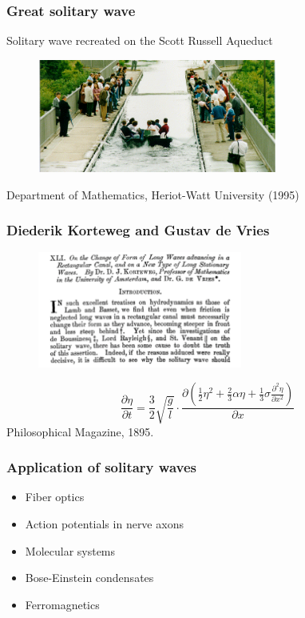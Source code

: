 \documentclass[16pt]{beamer}
\begin{document}
\begin{frame}
	\frametitle{ Great solitary wave }   
	\fontsize{16}{7.2}\selectfont
Solitary wave recreated on the Scott Russell Aqueduct
\begin{figure}[H]
\centering
\includegraphics[width=0.7\textwidth]{images/watersoliton.png}
\end{figure}
Department of Mathematics, Heriot-Watt University (1995)
\end{frame}

\begin{frame}
\frametitle{Diederik Korteweg and Gustav de Vries}
\fontsize{16}{7.2}\selectfont
\begin{figure}[H]
\centering
\includegraphics[width=0.6\textwidth]{images/KdVtitle2.png}
\end{figure}
\[
\frac{\partial \eta}{\partial t} = \frac{3}{2} \sqrt{\frac{g}{l}}\cdot
\frac{\partial
\left( \frac{1}{2} \eta^2 + \frac{2}{3} \alpha \eta + \frac{1}{3} \sigma \frac{\partial^2 \eta}{\partial x^2}\right)}{\partial x}
\]
Philosophical Magazine, 1895.
\end{frame}

\begin{frame}
\frametitle{Application of solitary waves}
\fontsize{16}{7.2}\selectfont
\begin{itemize}
	\item Fiber optics
	\vspace{0.25cm}
	\item Action potentials in nerve axons
	\vspace{0.25cm}
	\item Molecular systems
	\vspace{0.25cm}
	\item Bose-Einstein condensates
	\vspace{0.25cm}
	\item Ferromagnetics
\end{itemize}
\end{frame}
\end{document}

